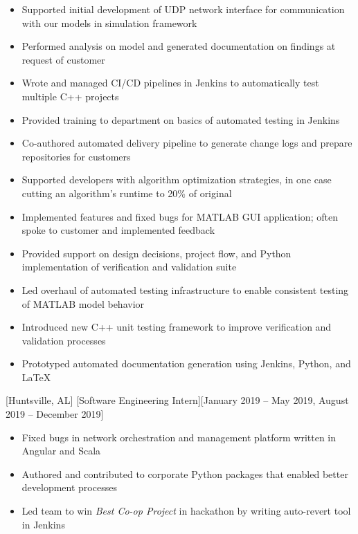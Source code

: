 \documentclass[hidelinks, 11pt]{article}
\begin{document}
\begin{itemize}
	\item Supported initial development of UDP network interface for communication with our models in simulation framework
	\item Performed analysis on model and generated documentation on findings at request of customer
	\item Wrote and managed CI/CD pipelines in Jenkins to automatically test multiple C++ projects
	\item Provided training to department on basics of automated testing in Jenkins
	\item Co-authored automated delivery pipeline to generate change logs and prepare repositories for customers
	\item Supported developers with algorithm optimization strategies, in one case cutting an algorithm's runtime to 20\% of original
	\item Implemented features and fixed bugs for MATLAB GUI application; often spoke to customer and implemented feedback
	\item Provided support on design decisions, project flow, and Python implementation of verification and validation suite
\end{itemize}


\begin{itemize}
	\item Led overhaul of automated testing infrastructure to enable consistent testing of MATLAB model behavior
	\item Introduced new C++ unit testing framework to improve verification and validation processes
	\item Prototyped automated documentation generation using Jenkins, Python, and LaTeX
\end{itemize}

[Huntsville, AL]
[Software Engineering Intern][January 2019 -- May 2019, August 2019 -- December 2019]

\begin{itemize}
	\item Fixed bugs in network orchestration and management platform written in Angular and Scala
	\item Authored and contributed to corporate Python packages that enabled better development processes
	\item Led team to win \textit{Best Co-op Project} in hackathon by writing auto-revert tool in Jenkins
\end{itemize}
\end{document}
